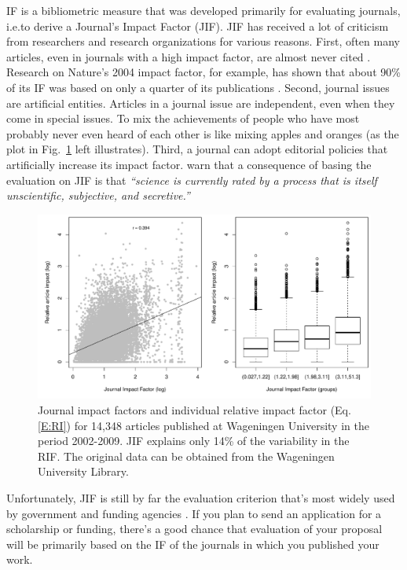 \documentclass[graybox,envcountchap,sectrefs,UStrade]{svmono}
\begin{document}
IF is a bibliometric measure that was developed primarily for evaluating journals, i.e.\@ to derive a Journal's Impact Factor (JIF). JIF has received a lot of criticism from researchers and research organizations for various reasons. First, often many articles, even in journals with a high impact factor, are almost never cited \citep{Seglen1997BMJ}. Research on Nature's 2004 impact factor, for example, has shown that about 90\% of its IF was based on only a quarter of its publications \citep{Editorial2005N}. Second, journal issues are artificial entities. Articles in a journal issue are independent, even when they come in special issues. To mix the achievements of people who have most probably never even heard of each other is like mixing apples and oranges (as the plot in Fig.\@~\ref{Fig:JIF_vs_RAI} left illustrates). Third, a journal can adopt editorial policies that artificially increase its impact factor. \citet{PLoS2006} warn that a consequence of basing the evaluation on JIF is that \emph{``science is currently rated by a process that is itself unscientific, subjective, and secretive.''}\par

\begin{figure}[!htb]
\begin{center}
  \includegraphics[width=\textwidth]{Fig_JIF_vs_RAI.pdf}
\caption{Journal impact factors and individual relative impact factor (Eq.\ref{E:RI}) for 14,348 articles published at Wageningen University in the period 2002-2009. JIF explains only 14\% of the variability in the RIF. The original data can be obtained from the Wageningen University Library.} \label{Fig:JIF_vs_RAI}
\end{center}
\end{figure}

Unfortunately, JIF is still by far the evaluation criterion that's most widely used by government and funding agencies \citep{Adler2009}. If you plan to send an application for a scholarship or funding, there's a good chance that evaluation of your proposal will be primarily based on the IF of the journals in which you published your work. \par
\end{document}
